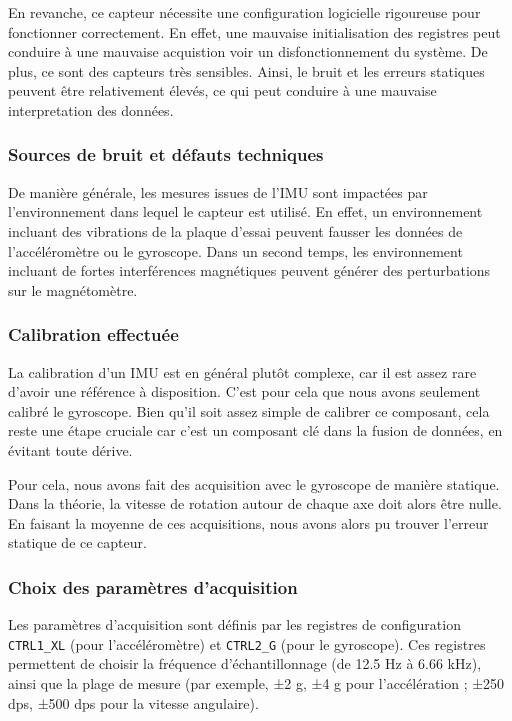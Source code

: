 En revanche, ce capteur nécessite une configuration logicielle rigoureuse pour fonctionner correctement. En effet, une mauvaise initialisation des registres peut conduire à une mauvaise acquistion voir un disfonctionnement du système. De plus, ce sont des capteurs très sensibles. Ainsi, le bruit et les erreurs statiques peuvent être relativement élevés, ce qui peut conduire à une mauvaise interpretation des données.

\vspace{1em}
\subsubsection*{Sources de bruit et défauts techniques}

De manière générale, les mesures issues de l'IMU sont impactées par l'environnement dans lequel le capteur est utilisé. En effet, un environnement incluant des vibrations de la plaque d’essai peuvent fausser les données de l'accéléromètre ou le gyroscope. Dans un second temps, les environnement incluant de fortes interférences magnétiques peuvent générer des perturbations sur le magnétomètre.

\vspace{1em}
\subsubsection*{Calibration effectuée}

La calibration d'un IMU est en général plutôt complexe, car il est assez rare d'avoir une référence à disposition. C'est pour cela que nous avons seulement calibré le gyroscope. Bien qu'il soit assez simple de calibrer ce composant, cela reste une étape cruciale car c'est un composant clé dans la fusion de données, en évitant toute dérive. 

Pour cela, nous avons fait des acquisition avec le gyroscope de manière statique. Dans la théorie, la vitesse de rotation autour de chaque axe doit alors être nulle. En faisant la moyenne de ces acquisitions, nous avons alors pu trouver l'erreur statique de ce capteur. 

\vspace{1em}
\subsubsection*{Choix des paramètres d’acquisition}

Les paramètres d’acquisition sont définis par les registres de configuration \texttt{CTRL1\_XL} (pour l’accéléromètre) et \texttt{CTRL2\_G} (pour le gyroscope). Ces registres permettent de choisir la fréquence d’échantillonnage (de 12.5 Hz à 6.66 kHz), ainsi que la plage de mesure (par exemple, ±2 g, ±4 g pour l’accélération ; ±250 dps, ±500 dps pour la vitesse angulaire).

